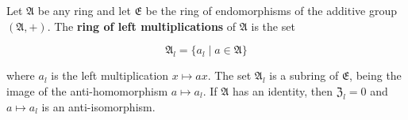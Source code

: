Let $\mathfrak{A}$ be any ring and let $\mathfrak{E}$ be the ring of endomorphisms of the additive group $(\mathfrak{A}, +)$. The \textbf{ring of left multiplications} of $\mathfrak{A}$ is the set

$$\mathfrak{A}_l = \{a_l \mid a \in \mathfrak{A}\}$$

where $a_l$ is the left multiplication $x \mapsto ax$. The set $\mathfrak{A}_l$ is a subring of $\mathfrak{E}$, being the image of the anti-homomorphism $a \mapsto a_l$. If $\mathfrak{A}$ has an identity, then $\mathfrak{Z}_l = 0$ and $a \mapsto a_l$ is an anti-isomorphism.
